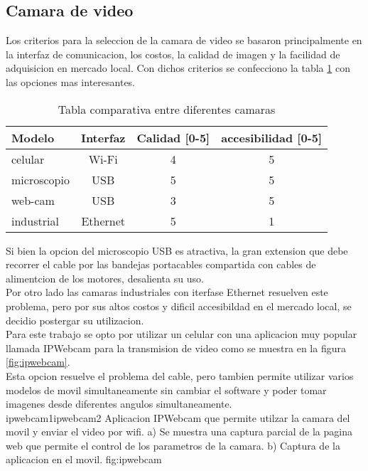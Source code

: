 \subsection{Camara de video}
   Los criterios para la seleccion de la camara de video se basaron principalmente en la interfaz de comunicacion, los costos, la calidad de imagen y la facilidad de adquisicion en mercado local. 
   Con dichos criterios se confecciono la tabla \ref{tab:camara_selection} con las opciones mas interesantes.

   \begin{table}[h]
   \centering
   \caption[Seleccion de la camara]{Tabla comparativa entre diferentes camaras}
   \begin{tabular}{l c c c}
      \toprule
      \textbf{Modelo}    & \textbf{Interfaz}       & \textbf{Calidad [0-5]} & \textbf{accesibilidad [0-5]}  \\
      \midrule
      celular     & Wi-Fi    & 4& 5\\
      microscopio & USB      & 5& 5\\
      web-cam     & USB      & 3& 5\\
      industrial  & Ethernet & 5& 1\\
      \bottomrule
      \hline
   \end{tabular}
   \label{tab:camara_selection}
\end{table}

Si bien la opcion del microscopio USB es atractiva, la gran extension que debe recorrer el cable por las bandejas portacables compartida con cables de alimentcion de los motores, desalienta su uso. \\
   Por otro lado las camaras industriales con iterfase Ethernet resuelven este problema, pero por sus altos costos y dificil accesibildad en el mercado local, se decidio postergar su utilizacion.\\
   Para este trabajo se opto por utilizar un celular con una aplicacion muy popular llamada IPWebcam \citep{WEBSITE:ipwebcam} para la transmision de video como se muestra en la figura \ref{fig:ipwebcam}. \\
   Esta opcion resuelve el problema del cable, pero tambien permite utilizar varios modelos de movil simultaneamente sin cambiar el software y poder tomar imagenes desde diferentes angulos simultaneamente. \\

            {ipwebcam1}{ipwebcam2}
            {Aplicacion IPWebcam que permite utilzar la camara del movil y enviar el video por wifi. a) Se muestra una captura parcial de la pagina web que permite el control de los parametros de la camara. b) Captura de la aplicacion en el movil.}
            {fig:ipwebcam}

